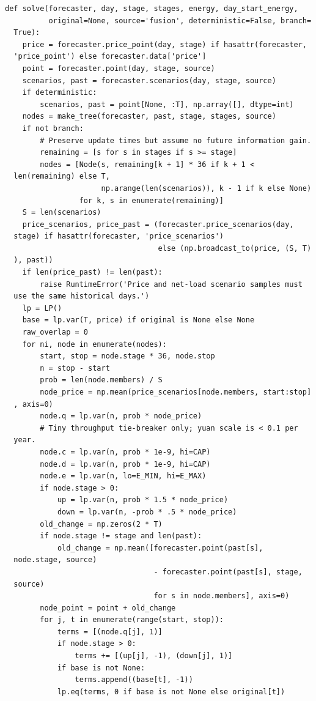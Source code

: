 \begin{verbatim}
def solve(forecaster, day, stage, stages, energy, day_start_energy,
          original=None, source='fusion', deterministic=False, branch=
  True):
    price = forecaster.price_point(day, stage) if hasattr(forecaster,
  'price_point') else forecaster.data['price']
    point = forecaster.point(day, stage, source)
    scenarios, past = forecaster.scenarios(day, stage, source)
    if deterministic:
        scenarios, past = point[None, :T], np.array([], dtype=int)
    nodes = make_tree(forecaster, past, stage, stages, source)
    if not branch:
        # Preserve update times but assume no future information gain.
        remaining = [s for s in stages if s >= stage]
        nodes = [Node(s, remaining[k + 1] * 36 if k + 1 <
  len(remaining) else T,
                      np.arange(len(scenarios)), k - 1 if k else None)
                 for k, s in enumerate(remaining)]
    S = len(scenarios)
    price_scenarios, price_past = (forecaster.price_scenarios(day,
  stage) if hasattr(forecaster, 'price_scenarios')
                                   else (np.broadcast_to(price, (S, T)
  ), past))
    if len(price_past) != len(past):
        raise RuntimeError('Price and net-load scenario samples must
  use the same historical days.')
    lp = LP()
    base = lp.var(T, price) if original is None else None
    raw_overlap = 0
    for ni, node in enumerate(nodes):
        start, stop = node.stage * 36, node.stop
        n = stop - start
        prob = len(node.members) / S
        node_price = np.mean(price_scenarios[node.members, start:stop]
  , axis=0)
        node.q = lp.var(n, prob * node_price)
        # Tiny throughput tie-breaker only; yuan scale is < 0.1 per
  year.
        node.c = lp.var(n, prob * 1e-9, hi=CAP)
        node.d = lp.var(n, prob * 1e-9, hi=CAP)
        node.e = lp.var(n, lo=E_MIN, hi=E_MAX)
        if node.stage > 0:
            up = lp.var(n, prob * 1.5 * node_price)
            down = lp.var(n, -prob * .5 * node_price)
        old_change = np.zeros(2 * T)
        if node.stage != stage and len(past):
            old_change = np.mean([forecaster.point(past[s],
  node.stage, source)
                                  - forecaster.point(past[s], stage,
  source)
                                  for s in node.members], axis=0)
        node_point = point + old_change
        for j, t in enumerate(range(start, stop)):
            terms = [(node.q[j], 1)]
            if node.stage > 0:
                terms += [(up[j], -1), (down[j], 1)]
            if base is not None:
                terms.append((base[t], -1))
            lp.eq(terms, 0 if base is not None else original[t])

\end{verbatim}
